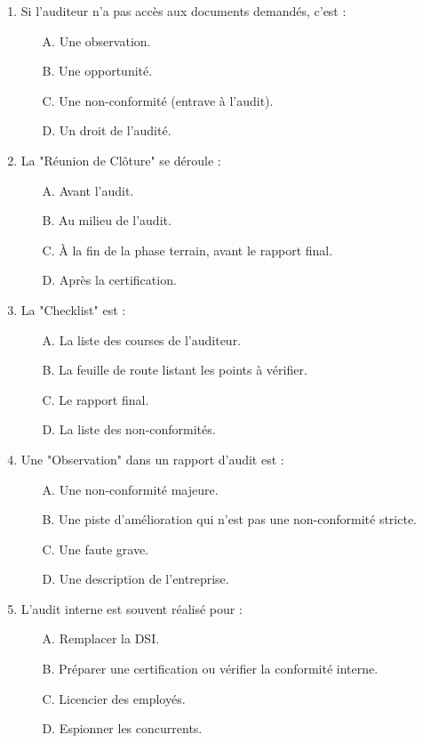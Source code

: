 \begin{enumerate}
    \item Si l'auditeur n'a pas accès aux documents demandés, c'est :
    \begin{itemize}
        \item[A.] Une observation.
        \item[B.] Une opportunité.
        \item[C.] Une non-conformité (entrave à l'audit).
        \item[D.] Un droit de l'audité.
    \end{itemize}

    \item La "Réunion de Clôture" se déroule :
    \begin{itemize}
        \item[A.] Avant l'audit.
        \item[B.] Au milieu de l'audit.
        \item[C.] À la fin de la phase terrain, avant le rapport final.
        \item[D.] Après la certification.
    \end{itemize}

    \item La "Checklist" est :
    \begin{itemize}
        \item[A.] La liste des courses de l'auditeur.
        \item[B.] La feuille de route listant les points à vérifier.
        \item[C.] Le rapport final.
        \item[D.] La liste des non-conformités.
    \end{itemize}

    \item Une "Observation" dans un rapport d'audit est :
    \begin{itemize}
        \item[A.] Une non-conformité majeure.
        \item[B.] Une piste d'amélioration qui n'est pas une non-conformité stricte.
        \item[C.] Une faute grave.
        \item[D.] Une description de l'entreprise.
    \end{itemize}

    \item L'audit interne est souvent réalisé pour :
    \begin{itemize}
        \item[A.] Remplacer la DSI.
        \item[B.] Préparer une certification ou vérifier la conformité interne.
        \item[C.] Licencier des employés.
        \item[D.] Espionner les concurrents.
    \end{itemize}
\end{enumerate}

